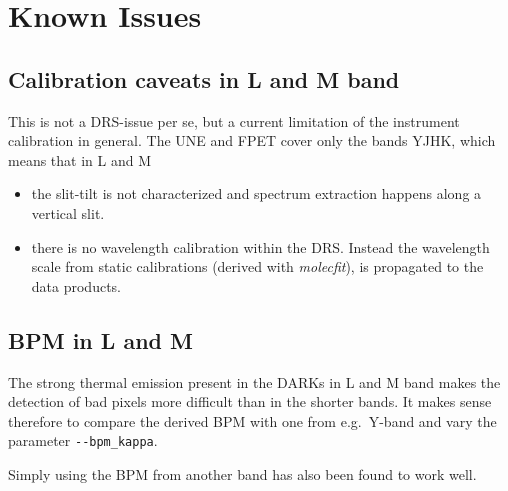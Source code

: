 \section{Known Issues}
\label{sec:knownissues}


\subsection{Calibration caveats in L and M band}

This is not a DRS-issue per se, but a current limitation of the instrument calibration in general. The UNE and FPET cover only the bands YJHK, which means that in L and M
\begin{itemize}
    \item the slit-tilt is not characterized and spectrum extraction happens along a vertical slit.
    \item there is no wavelength calibration within the DRS. Instead the wavelength scale from static calibrations (derived with \emph{molecfit}), is propagated to the data products.
\end{itemize}


\subsection{BPM in L and M}

The strong thermal emission present in the DARKs in L and M band makes the detection of bad pixels more difficult than in the shorter bands. It makes sense therefore to compare the derived BPM with one from e.g.~Y-band and vary the parameter \verb!--bpm_kappa!.

Simply using the BPM from another band has also been found to work well.


